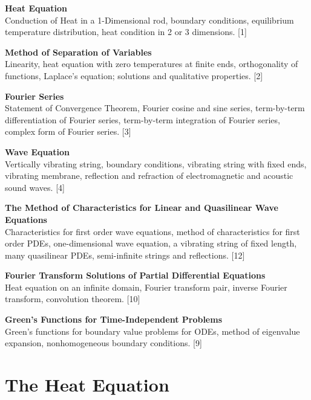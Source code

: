\documentclass{article}
\begin{document}
\maketitle
{\small
  \noindent\textbf{Heat Equation}\\
  Conduction of Heat in a 1-Dimensional rod, boundary conditions, equilibrium temperature distribution, heat condition in 2 or 3 dimensions.\hspace*{\fill} [1]

  \vspace{10pt}
  \noindent\textbf{Method of Separation of Variables}\\
  Linearity, heat equation with zero temperatures at finite ends, orthogonality of functions, Laplace's equation; solutions and qualitative properties.\hspace*{\fill} [2]

  \vspace{10pt}
  \noindent\textbf{Fourier Series}\\
  Statement of Convergence Theorem, Fourier cosine and sine series, term-by-term differentiation of Fourier series, term-by-term integration of Fourier series, complex form of Fourier series.\hspace*{\fill} [3]

  \vspace{10pt}
  \noindent\textbf{Wave Equation}\\
  Vertically vibrating string, boundary conditions, vibrating string with fixed ends, vibrating membrane, reflection and refraction of electromagnetic and acoustic sound waves.\hspace*{\fill} [4]

  \vspace{10pt}
  \noindent\textbf{The Method of Characteristics for Linear and Quasilinear
  	Wave Equations}\\
  Characteristics for first order wave equations, method of characteristics for first order PDEs, one-dimensional wave equation, a vibrating string of fixed length, many quasilinear PDEs, semi-infinite strings and reflections. \hspace*{\fill} [12]

  \vspace{10pt}
  \noindent\textbf{Fourier Transform Solutions of Partial
  	Differential Equations}\\
  Heat equation on an infinite domain, Fourier transform pair, inverse Fourier transform, convolution theorem.\hspace*{\fill} [10]

  \vspace{10pt}
  \noindent\textbf{Green’s Functions for Time-Independent Problems}\\
  Green's functions for boundary value problems for ODEs, method of eigenvalue expansion, nonhomogeneous boundary conditions.\hspace*{\fill} [9]}

\tableofcontents


	\section{The Heat Equation}
\end{document}
